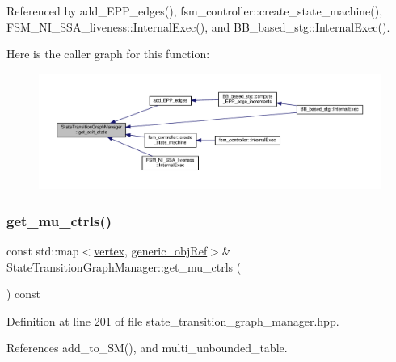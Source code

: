Referenced by add\+\_\+\+E\+P\+P\+\_\+edges(), fsm\+\_\+controller\+::create\+\_\+state\+\_\+machine(), F\+S\+M\+\_\+\+N\+I\+\_\+\+S\+S\+A\+\_\+liveness\+::\+Internal\+Exec(), and B\+B\+\_\+based\+\_\+stg\+::\+Internal\+Exec().

Here is the caller graph for this function\+:
\nopagebreak
\begin{figure}[H]
\begin{center}
\leavevmode
\includegraphics[width=350pt]{d9/dfd/classStateTransitionGraphManager_a90b68762a4640636759ca382c0e87aaf_icgraph}
\end{center}
\end{figure}
\mbox{\label{classStateTransitionGraphManager_a36ced3a88fdbef82df4edc3bad8cc1b8}} 
\subsubsection{\texorpdfstring{get\+\_\+mu\+\_\+ctrls()}{get\_mu\_ctrls()}}
{\footnotesize\ttfamily const std\+::map$<$\hyperlink{graph_8hpp_abefdcf0544e601805af44eca032cca14}{vertex}, \hyperlink{generic__obj_8hpp_acb533b2ef8e0fe72e09a04d20904ca81}{generic\+\_\+obj\+Ref}$>$\& State\+Transition\+Graph\+Manager\+::get\+\_\+mu\+\_\+ctrls (\begin{DoxyParamCaption}{ }\end{DoxyParamCaption}) const\hspace{0.3cm}{\ttfamily [inline]}}



Definition at line 201 of file state\+\_\+transition\+\_\+graph\+\_\+manager.\+hpp.



References add\+\_\+to\+\_\+\+S\+M(), and multi\+\_\+unbounded\+\_\+table.



